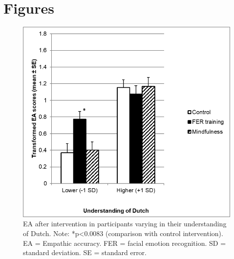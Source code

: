 \documentclass[authordate, empirical]{jote-new-article}
\begin{document}
\clearpage







\section{Figures}





        \begin{figure}[h!]
            \begin{fullwidth}
                \centering
            \includegraphics[width=0.9\linewidth]{media/image1.png}
            \caption{EA after intervention in participants varying in their understanding of Dutch. Note: *p<0.0083 (comparison with control intervention). EA = Empathic accuracy. FER = facial emotion recognition. SD = standard deviation. SE = standard error.}

            \label{fig:rId12}

            \end{fullwidth}
        \end{figure}
        
\end{document}
